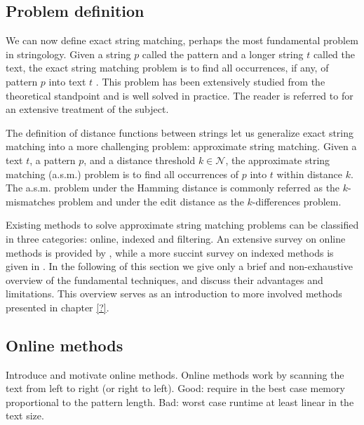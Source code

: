 \subsection{Problem definition}

We can now define exact string matching, perhaps the most fundamental problem in stringology.
Given a string $p$ called the pattern and a longer string $t$ called the text, the exact string matching problem is to find all occurrences, if any, of pattern $p$ into text $t$ \cite{Gusfield1997}.
This problem has been extensively studied from the theoretical standpoint and is well solved in practice. The reader is referred to \cite{?} for an extensive treatment of the subject.

The definition of distance functions between strings let us generalize exact string matching into a more challenging problem: approximate string matching.
Given a text $t$, a pattern $p$, and a distance threshold $k \in \mathcal{N}$, the approximate string matching (a.s.m.) problem is to find all occurrences of $p$ into $t$ within distance $k$.
The a.s.m. problem under the Hamming distance is commonly referred as the $k$-mismatches problem and under the edit distance as the $k$-differences problem.

Existing methods to solve approximate string matching problems can be classified in three categories: online, indexed and filtering.
An extensive survey on online methods is provided by \cite{Navarro1999}, while a more succint survey on indexed methods is given in \cite{Navarro2001}.
In the following of this section we give only a brief and non-exhaustive overview of the fundamental techniques, and discuss their advantages and limitations.
This overview serves as an introduction to more involved methods presented in chapter \ref{?}.


\subsection{Online methods}

Introduce and motivate online methods.
Online methods work by scanning the text from left to right (or right to left).
Good: require in the best case memory proportional to the pattern length.
Bad: worst case runtime at least linear in the text size.

